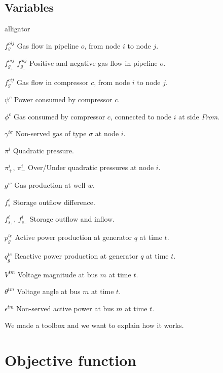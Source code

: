 \subsection*{Variables}

\begin{labeling}{alligator}
\item [${f}_{g}^{oij}$] Gas flow in pipeline $o$, from node $i$ to node $j$.
\item [${f}_{g_+}^{oij}$ ${f}_{g_-}^{oij}$] Positive and negative gas flow in pipeline $o$.
\item [${f}_{g}^{cij}$] Gas flow in compressor $c$, from node $i$ to node $j$.
\item [$\psi^{c}$] Power consumed by compressor $c$.
\item [$\phi^{c}$] Gas consumed by compressor $c$, connected to node $i$ at side \textit{From}.
\item [$\gamma^{i \sigma}$] Non-served gas of type $\sigma$ at node $i$.
\item [$\pi^{i}$] Quadratic pressure.
\item [${\pi}^{i}_{+}$, ${\pi}^{i}_{-}$] Over/Under quadratic pressures at node $i$.
\item [$g^{w}$] Gas production at well $w$.
\item [$f_{s}^{i}$] Storage outflow difference.
\item [$f_{s_+}^{i}$, $f_{s_-}^{i}$] Storage outflow and inflow.
\item [$p_{g}^{te}$] Active power production at generator $q$ at time $t$.
\item [$q_{g}^{te}$] Reactive power production at generator $q$ at time $t$.
\item [$V^{tm}$] Voltage magnitude at bus $m$ at time $t$.
\item [$\theta^{tm}$] Voltage angle at bus $m$ at time $t$.
\item [$\epsilon^{tm}$] Non-served active power at bus $m$ at time $t$.
\end{labeling}






We made a toolbox and we want to explain how it works.

\section{Objective function}

